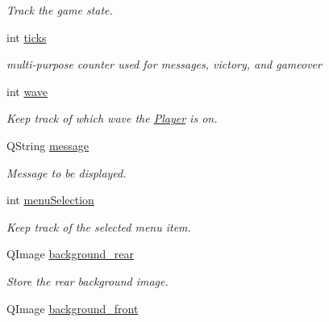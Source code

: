 \begin{DoxyCompactItemize}
\begin{DoxyCompactList}\small\item\em Track the game state. \end{DoxyCompactList}\item 
\hypertarget{classGameWidget_a32f7d37584c30f676edad86b4b0fd077}{
int \hyperlink{classGameWidget_a32f7d37584c30f676edad86b4b0fd077}{ticks}}
\label{classGameWidget_a32f7d37584c30f676edad86b4b0fd077}

\begin{DoxyCompactList}\small\item\em multi-\/purpose counter used for messages, victory, and gameover \end{DoxyCompactList}\item 
\hypertarget{classGameWidget_a3f18e981c913513695fdcefe89a36929}{
int \hyperlink{classGameWidget_a3f18e981c913513695fdcefe89a36929}{wave}}
\label{classGameWidget_a3f18e981c913513695fdcefe89a36929}

\begin{DoxyCompactList}\small\item\em Keep track of which wave the \hyperlink{classPlayer}{Player} is on. \end{DoxyCompactList}\item 
\hypertarget{classGameWidget_a4a0454b1cc244fc4bd07f753225d3d56}{
QString \hyperlink{classGameWidget_a4a0454b1cc244fc4bd07f753225d3d56}{message}}
\label{classGameWidget_a4a0454b1cc244fc4bd07f753225d3d56}

\begin{DoxyCompactList}\small\item\em Message to be displayed. \end{DoxyCompactList}\item 
\hypertarget{classGameWidget_a6cbf198a77bf38ee6fc5a6d935af8137}{
int \hyperlink{classGameWidget_a6cbf198a77bf38ee6fc5a6d935af8137}{menuSelection}}
\label{classGameWidget_a6cbf198a77bf38ee6fc5a6d935af8137}

\begin{DoxyCompactList}\small\item\em Keep track of the selected menu item. \end{DoxyCompactList}\item 
\hypertarget{classGameWidget_a550c56b6ff638102f86ed4261a23e94c}{
QImage \hyperlink{classGameWidget_a550c56b6ff638102f86ed4261a23e94c}{background\_\-rear}}
\label{classGameWidget_a550c56b6ff638102f86ed4261a23e94c}

\begin{DoxyCompactList}\small\item\em Store the rear background image. \end{DoxyCompactList}\item 
\hypertarget{classGameWidget_af513ccb5d0eb080571126361170dca63}{
QImage \hyperlink{classGameWidget_af513ccb5d0eb080571126361170dca63}{background\_\-front}}
\label{classGameWidget_af513ccb5d0eb080571126361170dca63}


\end{DoxyCompactItemize}
